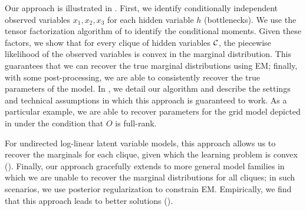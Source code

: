 Our approach is illustrated in . 
First, we identify conditionally independent observed variables $x_1,
  x_2, x_3$ for each hidden variable $h$ (bottlenecks). 
We use the tensor factorization algorithm of
  \citet{anandkumar12moments,anandkumar13tensor} to identify the
  conditional moments.
Given these factors, we show that for every clique of hidden variables
  $\mathcal{C}$, the piecewise likelihood of the observed variables is convex in
  the marginal distribution. 
This guarantees that we can recover the true marginal distributions
  using EM; finally, with some post-processing, we are able to
  consistently recover the true parameters of the model.
In , we detail our algorithm and describe the
  settings and technical assumptions in which this approach is guaranteed
  to work.
As a particular example, we are able to recover parameters for the
  grid model depicted in  under the condition that
  $O$ is full-rank.

For undirected log-linear latent variable models, this approach allows us to 
  recover the marginals for each clique, given which the learning
  problem is convex ().
Finally, our approach gracefully extends to more general model families
  in which we are unable to recover the marginal distributions for all
  cliques; in such scenarios, we use posterior regularization to constrain
  EM. 
Empirically, we find that this approach leads to better solutions
  ().

